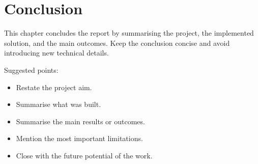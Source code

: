 \chapter{Conclusion}
\label{ch:conclusion}

This chapter concludes the report by summarising the project, the implemented solution, and the main outcomes. Keep the conclusion concise and avoid introducing new technical details.

Suggested points:
\begin{itemize}[noitemsep]
  \item Restate the project aim.
  \item Summarise what was built.
  \item Summarise the main results or outcomes.
  \item Mention the most important limitations.
  \item Close with the future potential of the work.
\end{itemize}
